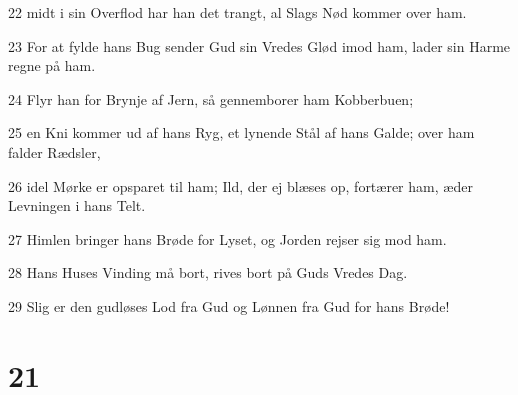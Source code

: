 \par 22 midt i sin Overflod har han det trangt, al Slags Nød kommer over ham.
\par 23 For at fylde hans Bug sender Gud sin Vredes Glød imod ham, lader sin Harme regne på ham.
\par 24 Flyr han for Brynje af Jern, så gennemborer ham Kobberbuen;
\par 25 en Kni kommer ud af hans Ryg, et lynende Stål af hans Galde; over ham falder Rædsler,
\par 26 idel Mørke er opsparet til ham; Ild, der ej blæses op, fortærer ham, æder Levningen i hans Telt.
\par 27 Himlen bringer hans Brøde for Lyset, og Jorden rejser sig mod ham.
\par 28 Hans Huses Vinding må bort, rives bort på Guds Vredes Dag.
\par 29 Slig er den gudløses Lod fra Gud og Lønnen fra Gud for hans Brøde!

\chapter{21}

